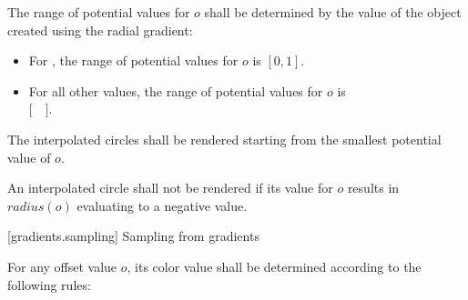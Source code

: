 \pnum
The range of potential values for $o$ shall be determined by the  value of the  object created using the radial gradient:
\begin{itemize}
\item For , the range of potential values for $o$ is $[0,1]$.
\item For all other  values, the range of potential values for $o$ is\\ $[$~~$]$.
\end{itemize}

\pnum
The interpolated circles shall be rendered starting from the smallest potential value of $o$.

\pnum
An interpolated circle shall not be rendered if its value for $o$ results in $radius(o)$ evaluating to a negative value.

 [gradients.sampling] {Sampling from gradients}

\pnum
For any offset value $o$, its color value shall be determined according to the following rules:

